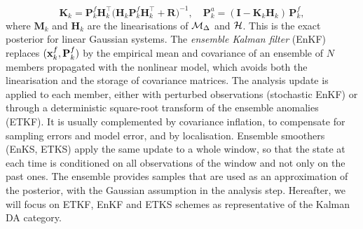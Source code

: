 \begin{itemize}
\begin{equation}
  \mathbf{K}_k = \mathbf{P}^f_k \mathbf{H}_k^\top
  \big(\mathbf{H}_k \mathbf{P}^f_k \mathbf{H}_k^\top + \mathbf{R}\big)^{-1}, \quad
  \mathbf{P}^a_k = (\mathbf{I} - \mathbf{K}_k \mathbf{H}_k)\, \mathbf{P}^f_k,
\end{equation}
where $\mathbf{M}_k$ and $\mathbf{H}_k$ are the linearisations of $\mathcal{M}_\Delta$ and $\mathcal{H}$. This is the exact posterior for linear Gaussian systems. The
\emph{ensemble Kalman filter} (EnKF) \cite{carrassi_data_2018,evensen_data_2009} replaces $(\mathbf{x}^f_k,
\mathbf{P}^f_k)$ by the empirical mean and covariance of an ensemble of $N$
members propagated with the nonlinear model, which avoids both the linearisation
and the storage of covariance matrices. The analysis update is applied to each
member, either with perturbed observations (stochastic EnKF) or through a
deterministic square-root transform of the ensemble anomalies (ETKF). It is
usually complemented by covariance inflation, to compensate for sampling errors
and model error, and by localisation. Ensemble smoothers (EnKS, ETKS) apply the
same update to a whole window, so that the state at each time is conditioned on
all observations of the window and not only on the past ones. The ensemble
provides samples that are used as an approximation of the posterior, with the
Gaussian assumption in the analysis step. Hereafter, we will focus on ETKF, EnKF and ETKS schemes as representative of the Kalman DA category. 
\end{itemize}

